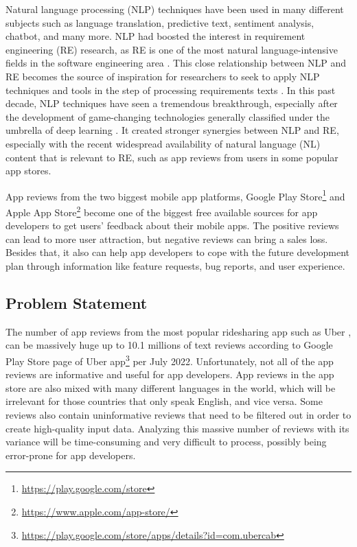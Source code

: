 \documentclass[12pt]{article}
\begin{document}
Natural language processing (NLP) techniques have been used in many different subjects such as language translation\cite{nlp_for_language_translation}, predictive text\cite{nlp_for_predictive_text}, sentiment analysis\cite{nlp_for_sentiment_analysis}, chatbot\cite{nlp_for_chatbot}, and many more. NLP had boosted the interest in requirement engineering (RE) research, as RE is one of the most natural language-intensive fields in the software engineering area \cite{nlp_for_re_2}. This close relationship between NLP and RE becomes the source of inspiration for researchers to seek to apply NLP techniques and tools in the step of processing requirements texts \cite{nlp_for_re}. In this past decade, NLP techniques have seen a tremendous breakthrough, especially after the development of game-changing technologies generally classified under the umbrella of deep learning \cite{trend_deep_learning_nlp}. It created stronger synergies between NLP and RE, especially with the recent widespread availability of natural language (NL) content that is relevant to RE, such as app reviews from users in some popular app stores.

App reviews from the two biggest mobile app platforms, Google Play Store\footnote{\url{https://play.google.com/store}} and Apple App Store\footnote{\url{https://www.apple.com/app-store/}} become one of the biggest free available sources for app developers to get users’ feedback about their mobile apps. The positive reviews can lead to more user attraction, but negative reviews can bring a sales loss. Besides that, it also can help app developers to cope with the future development plan through information like feature requests, bug reports, and user experience.

\subsection{Problem Statement}
The number of app reviews from the most popular ridesharing app such as Uber \cite{onde}, can be massively huge up to 10.1 millions of text reviews according to Google Play Store page of Uber app\footnote{\url{https://play.google.com/store/apps/details?id=com.ubercab}} per July 2022. Unfortunately, not all of the app reviews are informative and useful for app developers. App reviews in the app store are also mixed with many different languages in the world, which will be irrelevant for those countries that only speak English, and vice versa. Some reviews also contain uninformative reviews that need to be filtered out in order to create high-quality input data. Analyzing this massive number of reviews with its variance will be time-consuming and very difficult to process, possibly being error-prone for app developers.
\end{document}
